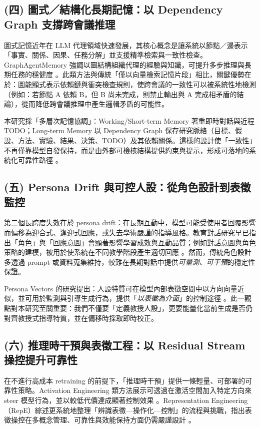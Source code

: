 \subsection*{(四) 圖式／結構化長期記憶：以 Dependency Graph 支撐跨會議推理}
圖式記憶近年在 LLM 代理領域快速發展，其核心概念是讓系統以節點／邊表示「事實、關係、因果、任務分解」並支援精準檢索與一致性檢查。GraphAgentMemory 強調以圖結構組織代理的經驗與知識，可提升多步推理與長期任務的穩健度 \citep{a2602_05665v1_graphagentmemory}。此類方法與傳統「僅以向量檢索記憶片段」相比，關鍵優勢在於：圖能顯式表示依賴鏈與衝突檢查規則，使跨會議的一致性可以被系統性地檢測（例如：若節點 A 依賴 B，但 B 尚未完成，則禁止輸出與 A 完成相矛盾的結論），從而降低跨會議推理中產生邏輯矛盾的可能性。

本研究採「多層次記憶協調」：Working/Short-term Memory 著重即時對話與近程 TODO；Long-term Memory 以 Dependency Graph 保存研究脈絡（目標、假設、方法、實驗、結果、決策、TODO）及其依賴關係。這樣的設計使「一致性」不再僅靠模型自發保持，而是由外部可檢核結構提供約束與提示，形成可落地的系統化可靠性路徑 \citep{a2310_08560v2_memgpt,a2602_05665v1_graphagentmemory}。

\subsection*{(五) Persona Drift 與可控人設：從角色設計到表徵監控}
第二個長跨度失效在於 persona drift：在長期互動中，模型可能受使用者回覆影響而偏移為迎合式、逢迎式回應，或失去學術嚴謹的指導風格。教育對話研究早已指出「角色」與「回應意圖」會顯著影響學習成效與互動品質；例如對話意圖與角色策略的建模，被用於使系統在不同教學階段產生適切回應 \citep{petukhova-kochmar-2025-intent,tao-etal-2024-rolecraft}。然而，傳統角色設計多透過 prompt 或資料蒐集維持，較難在長期對話中提供\emph{可量測、可干預}的穩定性保證。

Persona Vectors 的研究提出：人設特質可在模型內部表徵空間中以方向向量近似，並可用於監測與引導生成行為，提供「\emph{以表徵為介面}」的控制途徑 \citep{a2507_21509v3_personavectors}。此一觀點對本研究至關重要：我們不僅要「定義教授人設」，更要能量化當前生成是否仍對齊教授式指導特質，並在偏移時採取即時校正。

\subsection*{(六) 推理時干預與表徵工程：以 Residual Stream 操控提升可靠性}
在不進行高成本 retraining 的前提下，「推理時干預」提供一條輕量、可部署的可靠性策略。Activation Engineering 類方法展示可透過在激活空間加入特定方向來 steer 模型行為，並以較低代價達成顯著控制效果 \citep{turner-etal-2023-activation-addition}。Representation Engineering（RepE）綜述更系統地整理「辨識表徵—操作化—控制」的流程與挑戰，指出表徵操控在多概念管理、可靠性與效能保持方面仍需嚴謹設計 \citep{wehner-etal-2025-representation-engineering}。

